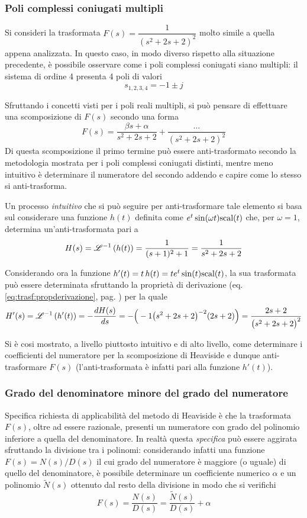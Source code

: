 		\subsubsection{Poli complessi coniugati multipli}
			Si consideri la trasformata $F(s) = \dfrac{1}{(s^2+2s+2)^2}	$ molto simile a quella appena analizzata. In questo caso, in modo diverso rispetto alla situazione precedente, è possibile osservare come i poli complessi coniugati siano multipli: il sistema di ordine 4 presenta 4 poli di valori
			\[ s_{1,2,3,4} = -1 \pm j \]
			
			Sfruttando i concetti visti per i poli reali multipli, si può pensare di effettuare una scomposizione di $F(s)$ secondo una forma
			\[ F(s) = \frac{\beta s + \alpha}{s^2+2s+2} + \frac{\dots}{(s^2+2s+2)^2}\]
			Di questa scomposizione il primo termine può essere anti-trasformato secondo la metodologia mostrata per i poli complessi coniugati distinti, mentre meno intuitivo è determinare il numeratore del secondo addendo e capire come lo stesso si anti-trasforma.
			
			Un processo \textit{intuitivo} che si può seguire per anti-trasformare tale elemento si basa sul considerare una funzione $h(t)$ definita come $e^t\sin(\omega t) \textrm{scal}(t)$ che, per $\omega = 1$, determina un'anti-trasformata pari a 
			\[H(s) = \mathscr {L}^{-1} \left( h(t) \right) = \frac{1}{(s+1)^2+1} = \frac 1 {s^2+2s+2}\]
			
			Considerando ora la funzione $h'(t) =t \, h(t) = t e^t\sin( t)\textrm{scal}(t)$, la sua trasformata può essere determinata sfruttando la proprietà di derivazione (eq. \ref{eq:trasf:propderivazione}, pag. \pageref{eq:trasf:propderivazione}) per la quale
			\[ H'(s) = \mathscr {L}^{-1} \left( h'(t) \right) = - \frac{dH(s)}{ds} = - \Big(-1 \big(s^2+2s+2\big)^{-2}(2s+2)\Big) = \frac{2s+ 2}{\big(s^2 +2s+2\big)^2} \]
			
			Si è cosi mostrato, a livello piuttosto intuitivo e di alto livello, come determinare i coefficienti del numeratore per la scomposizione di Heaviside e dunque anti-trasformare $F(s)$ (l'anti-trasformata è infatti pari alla funzione $h'(t)$).
		
		\subsubsection{Grado del denominatore minore del grado del numeratore}
			
			Specifica richiesta di applicabilità del metodo di Heaviside è che la trasformata $F(s)$, oltre ad essere razionale, presenti un numeratore con grado del polinomio inferiore a quella del denominatore. In realtà questa \textit{specifica} può essere aggirata sfruttando la divisione tra i polinomi: considerando infatti una funzione $F(s) = N(s) / D(s)$ il cui grado del numeratore è maggiore (o uguale) di quello del denominatore, è possibile determinare un coefficiente numerico $\alpha$ e un polinomio $\tilde N(s)$ ottenuto dal resto della divisione in modo che si verifichi
			\[F(s) = \frac{N(s)}{D(s)} = \frac{\tilde N(s)}{D(s)} + \alpha\]
			
